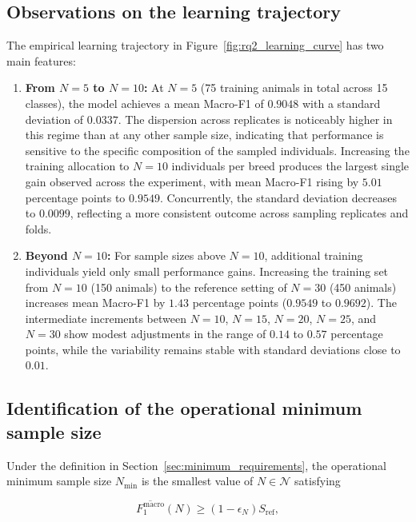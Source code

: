 \subsection{Observations on the learning trajectory}

The empirical learning trajectory in Figure~\ref{fig:rq2_learning_curve}
has two main features:

\begin{enumerate}
    \item \textbf{From $N=5$ to $N=10$:}
    At $N=5$ (75 training animals in total across 15 classes), the model
    achieves a mean Macro-F1 of $0.9048$ with a standard deviation of
    $0.0337$. The dispersion across replicates is noticeably higher in this
    regime than at any other sample size, indicating that performance is
    sensitive to the specific composition of the sampled individuals.
    Increasing the training allocation to $N=10$ individuals per breed
    produces the largest single gain observed across the experiment, with
    mean Macro-F1 rising by $5.01$ percentage points to $0.9549$.
    Concurrently, the standard deviation decreases to $0.0099$, reflecting a
    more consistent outcome across sampling replicates and folds.

    \item \textbf{Beyond $N=10$:}
    For sample sizes above $N=10$, additional training individuals yield
    only small performance gains. Increasing the training set
    from $N=10$ (150 animals) to the reference setting of $N=30$ (450 animals)
    increases mean Macro-F1 by $1.43$ percentage points ($0.9549$ to $0.9692$).
    The intermediate increments between $N=10$, $N=15$, $N=20$, $N=25$, and
    $N=30$ show modest adjustments in the range of $0.14$ to $0.57$ percentage
    points, while the variability remains stable with standard deviations
    close to $0.01$.
\end{enumerate}

\subsection{Identification of the operational minimum sample size}

Under the definition in Section~\ref{sec:minimum_requirements}, the
operational minimum sample size $N_{\min}$ is the smallest value of
$N\in\mathcal{N}$ satisfying

\begin{equation}
    \overline{F_1^{\mathrm{macro}}}(N)
    \geq
    (1 - \epsilon_N) S_{\mathrm{ref}},
\end{equation}

